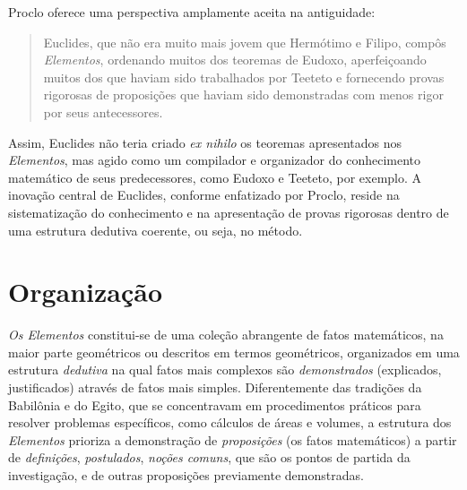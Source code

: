 \documentclass{hipatia}
\begin{document}
Proclo oferece uma perspectiva amplamente aceita
na antiguidade:
\begin{quote}
	Euclides, que não era muito mais jovem que
	Hermótimo e Filipo, compôs \emph{Elementos},
	ordenando muitos dos teoremas de Eudoxo,
	aperfeiçoando muitos dos que haviam sido
	trabalhados por Teeteto e fornecendo provas
	rigorosas de proposições que haviam sido
	demonstradas com menos rigor por seus
	antecessores.
	\cite{jones2005}
\end{quote}
Assim, Euclides não teria criado \emph{ex nihilo}
os teoremas apresentados nos \emph{Elementos}, mas agido
como um compilador e organizador do conhecimento
matemático de seus predecessores, como Eudoxo e
Teeteto, por exemplo. A inovação central de
Euclides, conforme enfatizado por Proclo, reside
na sistematização do conhecimento e na apresentação de
provas rigorosas dentro de uma estrutura dedutiva
coerente, ou seja, no método. 

\section{Organização}

\emph{Os Elementos} constitui-se de uma coleção abrangente de
fatos matemáticos, na maior parte
geométricos ou descritos em termos 
geométricos, organizados em uma estrutura \emph{dedutiva}
na qual fatos mais complexos são \emph{demonstrados}
(explicados, justificados) através de fatos
mais simples.
Diferentemente
das tradições da Babilônia e do Egito, que se
concentravam em procedimentos práticos para
resolver problemas específicos, como cálculos de
áreas e volumes, a estrutura dos \emph{Elementos} prioriza a
demonstração de \emph{proposições} (os fatos
matemáticos) a partir de
\emph{definições}, \emph{postulados}, \emph{noções comuns}, 
que são os pontos de partida da investigação,
e de outras proposições previamente demonstradas. 
\end{document}
